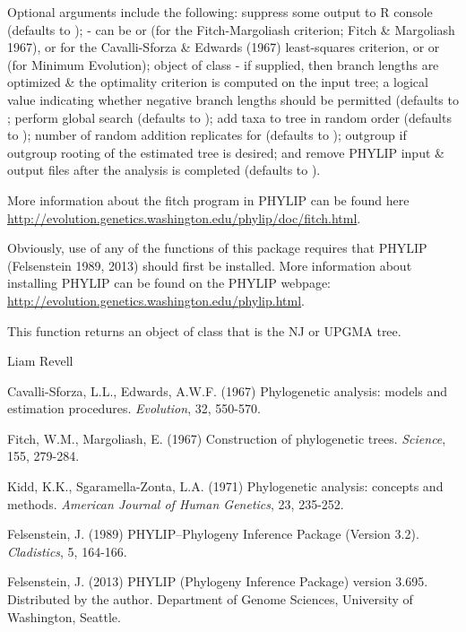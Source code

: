 \documentclass[a4paper]{book}
\begin{document}
\begin{Details}\relax
Optional arguments include the following:  suppress some output to R console (defaults to );  - can be  or  (for the Fitch-Margoliash criterion; Fitch \& Margoliash 1967),  or  for the Cavalli-Sforza \& Edwards (1967) least-squares criterion, or  or  (for Minimum Evolution);  object of class  - if supplied, then branch lengths are optimized \& the optimality criterion is computed on the input tree;  a logical value indicating whether negative branch lengths should be permitted (defaults to ;  perform global search (defaults to );  add taxa to tree in random order (defaults to );  number of random addition replicates for  (defaults to );  outgroup if outgroup rooting of the estimated tree is desired; and  remove PHYLIP input \& output files after the analysis is completed (defaults to ).

More information about the fitch program in PHYLIP can be found here \url{http://evolution.genetics.washington.edu/phylip/doc/fitch.html}.

Obviously, use of any of the functions of this package requires that PHYLIP (Felsenstein 1989, 2013) should first be installed. More information about installing PHYLIP can be found on the PHYLIP webpage: \url{http://evolution.genetics.washington.edu/phylip.html}.
\end{Details}
%
\begin{Value}
This function returns an object of class  that is the NJ or UPGMA tree.
\end{Value}
%
\begin{Author}\relax
Liam Revell 
\end{Author}
%
\begin{References}\relax
Cavalli-Sforza, L.L., Edwards, A.W.F. (1967) Phylogenetic analysis: models and estimation procedures. \emph{Evolution}, 32, 550-570. 

Fitch, W.M., Margoliash, E. (1967) Construction of phylogenetic trees. \emph{Science}, 155, 279-284.

Kidd, K.K., Sgaramella-Zonta, L.A. (1971) Phylogenetic analysis: concepts and methods. \emph{American Journal of Human Genetics}, 23, 235-252. 	

Felsenstein, J. (1989) PHYLIP--Phylogeny Inference Package (Version 3.2). \emph{Cladistics}, 5, 164-166.

Felsenstein, J. (2013) PHYLIP (Phylogeny Inference Package) version 3.695. Distributed by the author. Department of Genome Sciences, University of Washington, Seattle.
\end{References}
\end{document}
